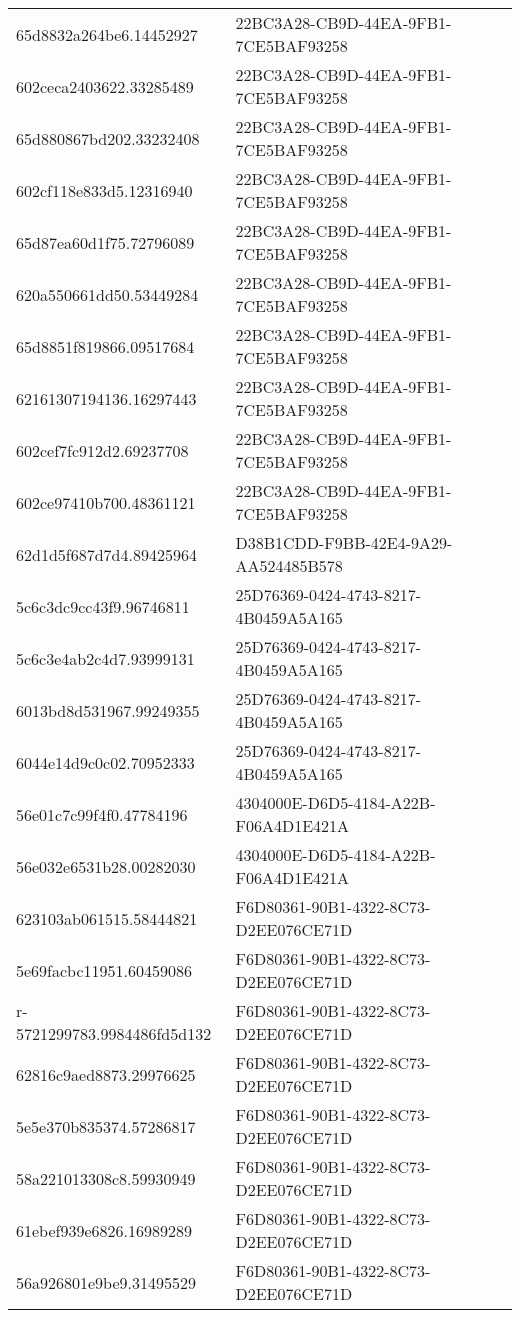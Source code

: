 \begin{tabular}{ll}
65d8832a264be6.14452927 & 22BC3A28-CB9D-44EA-9FB1-7CE5BAF93258 \\
602ceca2403622.33285489 & 22BC3A28-CB9D-44EA-9FB1-7CE5BAF93258 \\
65d880867bd202.33232408 & 22BC3A28-CB9D-44EA-9FB1-7CE5BAF93258 \\
602cf118e833d5.12316940 & 22BC3A28-CB9D-44EA-9FB1-7CE5BAF93258 \\
65d87ea60d1f75.72796089 & 22BC3A28-CB9D-44EA-9FB1-7CE5BAF93258 \\
620a550661dd50.53449284 & 22BC3A28-CB9D-44EA-9FB1-7CE5BAF93258 \\
65d8851f819866.09517684 & 22BC3A28-CB9D-44EA-9FB1-7CE5BAF93258 \\
62161307194136.16297443 & 22BC3A28-CB9D-44EA-9FB1-7CE5BAF93258 \\
602cef7fc912d2.69237708 & 22BC3A28-CB9D-44EA-9FB1-7CE5BAF93258 \\
602ce97410b700.48361121 & 22BC3A28-CB9D-44EA-9FB1-7CE5BAF93258 \\
62d1d5f687d7d4.89425964 & D38B1CDD-F9BB-42E4-9A29-AA524485B578 \\
5c6c3dc9cc43f9.96746811 & 25D76369-0424-4743-8217-4B0459A5A165 \\
5c6c3e4ab2c4d7.93999131 & 25D76369-0424-4743-8217-4B0459A5A165 \\
6013bd8d531967.99249355 & 25D76369-0424-4743-8217-4B0459A5A165 \\
6044e14d9c0c02.70952333 & 25D76369-0424-4743-8217-4B0459A5A165 \\
56e01c7c99f4f0.47784196 & 4304000E-D6D5-4184-A22B-F06A4D1E421A \\
56e032e6531b28.00282030 & 4304000E-D6D5-4184-A22B-F06A4D1E421A \\
623103ab061515.58444821 & F6D80361-90B1-4322-8C73-D2EE076CE71D \\
5e69facbc11951.60459086 & F6D80361-90B1-4322-8C73-D2EE076CE71D \\
r-5721299783.9984486fd5d132 & F6D80361-90B1-4322-8C73-D2EE076CE71D \\
62816c9aed8873.29976625 & F6D80361-90B1-4322-8C73-D2EE076CE71D \\
5e5e370b835374.57286817 & F6D80361-90B1-4322-8C73-D2EE076CE71D \\
58a221013308c8.59930949 & F6D80361-90B1-4322-8C73-D2EE076CE71D \\
61ebef939e6826.16989289 & F6D80361-90B1-4322-8C73-D2EE076CE71D \\
56a926801e9be9.31495529 & F6D80361-90B1-4322-8C73-D2EE076CE71D \\

\end{tabular}
